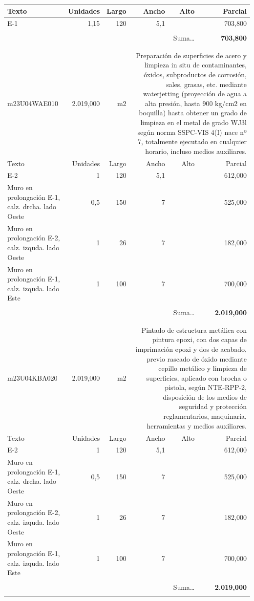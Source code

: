 \documentclass{book}%
\begin{document}
\begin{longtable}{lrrrrr}
Texto&Unidades&Largo&Ancho&Alto&Parcial\\%
\hline%
\multicolumn{1}{p{3.5cm}}{E{-}1}&1,15&120&5,1&&   703,800\\%
&&&&&\\%
\multicolumn{5}{r}{Suma\ldots}&\textbf{   703,800}\\%
\hline%
&&&&&\\%
&&&&&\\%
m23U04WAE010& 2.019,000& m2&\multicolumn{3}{p{6cm}}{\scriptsize Preparación de superficies de acero y limpieza in situ de contaminantes, óxidos, subproductos de corrosión, sales, grasas, etc. mediante waterjetting (proyección de agua a alta presión, hasta 900 kg/cm2 en boquilla) hasta obtener un grado de limpieza en el metal de grado WJ3l según norma SSPC-VIS 4(I) nace nº 7, totalmente ejecutado en cualquier horario, incluso medios auxiliares.\normalsize}\\%
Texto&Unidades&Largo&Ancho&Alto&Parcial\\%
\hline%
\multicolumn{1}{p{3.5cm}}{E{-}2}&1&120&5,1&&   612,000\\%
\multicolumn{1}{p{3.5cm}}{Muro en prolongación E{-}1, calz. drcha. lado Oeste}&0,5&150&7&&   525,000\\%
\multicolumn{1}{p{3.5cm}}{Muro en prolongación E{-}2, calz. izquda. lado Oeste}&1&26&7&&   182,000\\%
\multicolumn{1}{p{3.5cm}}{Muro en prolongación E{-}1, calz. izquda. lado Este}&1&100&7&&   700,000\\%
&&&&&\\%
\multicolumn{5}{r}{Suma\ldots}&\textbf{ 2.019,000}\\%
\hline%
&&&&&\\%
&&&&&\\%
m23U04KBA020& 2.019,000& m2&\multicolumn{3}{p{6cm}}{\scriptsize Pintado de estructura metálica con pintura epoxi, con dos capas de imprimación epoxi y dos de acabado, previo rascado de óxido mediante cepillo metálico y limpieza de superficies, aplicado con brocha o pistola, según NTE-RPP-2, disposición de los medios de seguridad y protección reglamentarios, maquinaria, herramientas y medios auxiliares.\normalsize}\\%
Texto&Unidades&Largo&Ancho&Alto&Parcial\\%
\hline%
\multicolumn{1}{p{3.5cm}}{E{-}2}&1&120&5,1&&   612,000\\%
\multicolumn{1}{p{3.5cm}}{Muro en prolongación E{-}1, calz. drcha. lado Oeste}&0,5&150&7&&   525,000\\%
\multicolumn{1}{p{3.5cm}}{Muro en prolongación E{-}2, calz. izquda. lado Oeste}&1&26&7&&   182,000\\%
\multicolumn{1}{p{3.5cm}}{Muro en prolongación E{-}1, calz. izquda. lado Este}&1&100&7&&   700,000\\%
&&&&&\\%
\multicolumn{5}{r}{Suma\ldots}&\textbf{ 2.019,000}\\%
\hline%
&&&&&\\%
\end{longtable}%
\newpage
\end{document}
